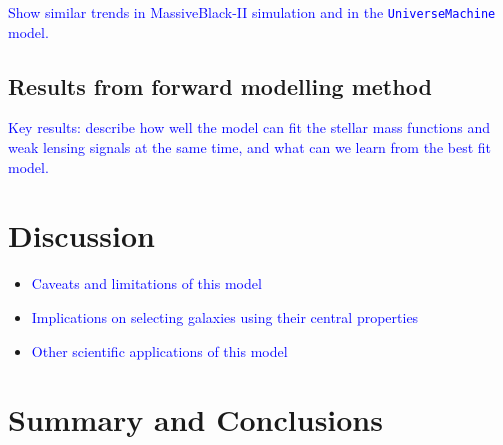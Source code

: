 \documentclass[a4paper,fleqn,usenatbib]{mnras}
\def\um{\texttt{UniverseMachine}}
\newcommand{\plan}[1]{\textcolor{blue}{#1}}
\begin{document}
    \plan{Show similar trends in MassiveBlack-II simulation and in the \um{} model.}
          
\subsection{Results from forward modelling method}
    \label{ssec:m100_m10}
    
    \plan{Key results: describe how well the model can fit the stellar mass functions 
          and weak lensing signals at the same time, and what can we learn from the 
          best fit model.}

\section{Discussion}
    \label{sec:discussion}
    
    \begin{itemize}
        
        \item \plan{Caveats and limitations of this model}

        \item \plan{Implications on selecting galaxies using their central properties}
        
        \item \plan{Other scientific applications of this model}
                        
    \end{itemize}


\section{Summary and Conclusions}
    \label{sec:summary}
    
  
\end{document}

